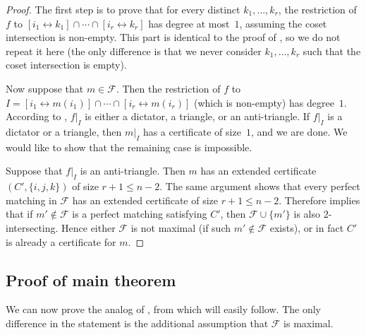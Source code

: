 \documentclass{article}
\theoremstyle{definition}
\providecommand{\dcoset}[2]{[#1 \leftrightarrow #2]}
\begin{document}
\begin{proof}
The first step is to prove that for every distinct $k_1,\ldots,k_r$, the restriction of $f$ to $\dcoset{i_1}{k_1} \cap \cdots \cap \dcoset{i_r}{k_r}$ has degree at most~$1$, assuming the coset intersection is non-empty. This part is identical to the proof of , so we do not repeat it here (the only difference is that we never consider $k_1,\ldots,k_r$ such that the coset intersection is empty).

Now suppose that $m \in \mathcal{F}$. Then the restriction of $f$ to $I = \dcoset{i_1}{m(i_1)} \cap \cdots \cap \dcoset{i_r}{m(i_r)}$ (which is non-empty) has degree~$1$. According to , $f|_I$ is either a dictator, a triangle, or an anti-triangle. If $f|_I$ is a dictator or a triangle, then $m|_I$ has a certificate of size~$1$, and we are done. We would like to show that the remaining case is impossible.

Suppose that $f|_I$ is an anti-triangle. Then $m$ has an extended certificate $(C',\{i,j,k\})$ of size $r+1 \leq n-2$. The same argument shows that every perfect matching in $\mathcal{F}$ has an extended certificate of size $r+1 \leq n-2$. Therefore  implies that if $m' \notin \mathcal{F}$ is a perfect matching satisfying $C'$, then $\mathcal{F} \cup \{m'\}$ is also $2$-intersecting. Hence either $\mathcal{F}$ is not maximal (if such $m' \notin \mathcal{F}$ exists), or in fact $C'$ is already a certificate for $m$.
\end{proof}

\subsection{Proof of main theorem} \label{sec:proof-pms}

We can now prove the analog of , from which  will easily follow. The only difference in the statement is the additional assumption that $\mathcal{F}$ is maximal.
\end{document}
